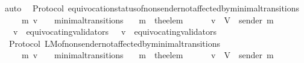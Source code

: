 \begin{isabellebody}
\ auto\isanewline
{}\isamarkupfalse%
%
\endisatagproof
{\isafoldproof}%
%
\isadelimproof
\isanewline
%
\endisadelimproof
\isanewline
\isanewline
{}\isamarkupfalse%
\ {\isacharparenleft}\ Protocol{\isacharparenright}\ equivocation{\isacharunderscore}status{\isacharunderscore}of{\isacharunderscore}non{\isacharunderscore}sender{\isacharunderscore}not{\isacharunderscore}affected{\isacharunderscore}by{\isacharunderscore}minimal{\isacharunderscore}transitions\ {\isacharcolon}\isanewline
\ \ {\isachardoublequoteopen}{\isasymforall}\ {\isasymsigma}\ {\isasymsigma}{\isacharprime}\ m{\isacharprime}\ v{\isachardot}\ {\isacharparenleft}{\isasymsigma}{\isacharcomma}\ {\isasymsigma}{\isacharprime}{\isacharparenright}\ {\isasymin}\ minimal{\isacharunderscore}transitions\isanewline
\ \ {\isasymlongrightarrow}\ m{\isacharprime}\ {\isacharequal}\ the{\isacharunderscore}elem\ {\isacharparenleft}{\isasymsigma}{\isacharprime}\ {\isacharminus}\ {\isasymsigma}{\isacharparenright}\isanewline
\ \ {\isasymlongrightarrow}\ v\ {\isasymin}\ V\ {\isacharminus}\ {\isacharbraceleft}sender\ m{\isacharprime}{\isacharbraceright}\isanewline
\ \ {\isasymlongrightarrow}\ v\ {\isasymin}\ equivocating{\isacharunderscore}validators\ {\isasymsigma}\ {\isasymlongleftrightarrow}\ v\ {\isasymin}\ equivocating{\isacharunderscore}validators\ {\isasymsigma}{\isacharprime}{\isachardoublequoteclose}\isanewline
%
\isadelimproof
\ \ %
\endisadelimproof
%
\isatagproof
{}\isamarkupfalse%
%
\endisatagproof
{\isafoldproof}%
%
\isadelimproof
\isanewline
%
\endisadelimproof
\isanewline
\isanewline
{}\isamarkupfalse%
\ {\isacharparenleft}\ Protocol{\isacharparenright}\ L{\isacharunderscore}M{\isacharunderscore}of{\isacharunderscore}non{\isacharunderscore}sender{\isacharunderscore}not{\isacharunderscore}affected{\isacharunderscore}by{\isacharunderscore}minimal{\isacharunderscore}transitions\ {\isacharcolon}\isanewline
\ \ {\isachardoublequoteopen}{\isasymforall}\ {\isasymsigma}\ {\isasymsigma}{\isacharprime}\ m{\isacharprime}\ v{\isachardot}\ {\isacharparenleft}{\isasymsigma}{\isacharcomma}\ {\isasymsigma}{\isacharprime}{\isacharparenright}\ {\isasymin}\ minimal{\isacharunderscore}transitions\isanewline
\ \ {\isasymlongrightarrow}\ m{\isacharprime}\ {\isacharequal}\ the{\isacharunderscore}elem\ {\isacharparenleft}{\isasymsigma}{\isacharprime}\ {\isacharminus}\ {\isasymsigma}{\isacharparenright}\isanewline
\ \ {\isasymlongrightarrow}\ v\ {\isasymin}\ V\ {\isacharminus}\ {\isacharbraceleft}sender\ m{\isacharprime}{\isacharbraceright}\isanewline

\end{isabellebody}
